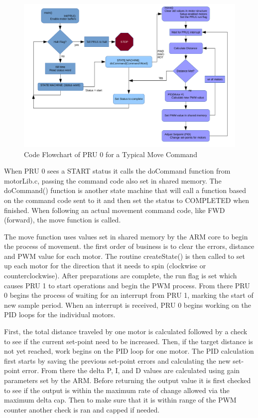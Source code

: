 \documentclass[12pt,oneside,final]{siuethesis}
\theoremstyle{definition}
\begin{document}
\begin{figure}
 \centering
 \includegraphics[scale=.5,keepaspectratio=true]{./images_ch3/PRU0FlowNew.png}
 \caption{Code Flowchart of PRU 0 for a Typical Move Command}
 \label{fig:PRU0_flow}
\end{figure}

When PRU 0 sees a START status it calls the doCommand function from motorLib.c, passing the command code also set in shared memory. The doCommand() function is another state machine that will call a function based on the command code sent to it and then set the status to COMPLETED when finished. When following an actual movement command code, like FWD (forward), the move function is called. 

The move function uses values set in shared memory by the ARM core to begin the process of movement. the first order of business is to clear the errors, distance and PWM value for each motor.  The routine createState() is then called to set up each motor for the direction that it needs to spin (clockwise or counterclockwise). After preparations are complete, the run flag is set which causes PRU 1 to start operations and begin the PWM process. From there PRU 0 begins the process of waiting for an interrupt from PRU 1, marking the start of new sample period. When an interrupt is received, PRU 0 begins working on the PID loops for the individual motors. 

First, the total distance traveled by one motor is calculated followed by a check to see if the current set-point need to be increased. Then, if the target distance is not yet reached, work begins on the PID loop for one motor. The PID calculation first starts by saving the previous set-point errors and calculating the new set-point error. From there the delta P, I, and D values are calculated using gain parameters set by the ARM. Before returning the output value it is first checked to see if the output is within the maximum rate of change allowed via the maximum delta cap. Then to make sure that it is within range of the PWM counter another check is ran and capped if needed. 
\end{document}
